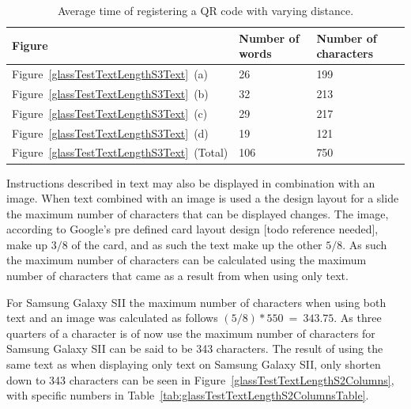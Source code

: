 	\begin{table}[ht!]
    		\caption{Average time of registering a QR code with varying distance.} \label{tab:glassTestTextLengthS3TextTable}
		\centering \begin{tabularx}{\textwidth}{l|X|X} \hline
		\textbf{Figure} & \textbf{Number of words} & \textbf{Number of characters} \\ \hline \hline
       
		Figure~\ref{glassTestTextLengthS3Text}~(a)	&26	&199	\\ \hline
		Figure~\ref{glassTestTextLengthS3Text}~(b)	&32	&213	\\ \hline
		Figure~\ref{glassTestTextLengthS3Text}~(c)	&29	&217	\\ \hline
		Figure~\ref{glassTestTextLengthS3Text}~(d)	&19	&121	\\ \hline
		Figure~\ref{glassTestTextLengthS3Text}~(Total)	&106	&750	\\ \hline
		
		\end{tabularx}
	\end{table}

Instructions described in text may also be displayed in combination with an image. When text combined with an image is used a the design layout for a slide the maximum number of characters that can be displayed changes. The image, according to Google's pre defined card layout design [todo reference needed], make up \(3/8\) of the card, and as such the text make up the other \(5/8\). As such the maximum number of characters can be calculated using the maximum number of characters that came as a result from when using only text.

For Samsung Galaxy SII the maximum number of characters when using both text and an image was calculated as follows \((5/8)*550~=~343.75\). As three quarters of a character is of now use the maximum number of characters for Samsung Galaxy SII can be said to be 343 characters. The result of using the same text as when displaying only text on Samsung Galaxy SII, only shorten down to 343 characters can be seen in Figure~\ref{glassTestTextLengthS2Columns}, with specific numbers in Table~\ref{tab:glassTestTextLengthS2ColumnsTable}.

